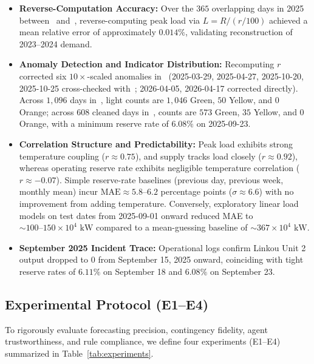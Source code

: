 \documentclass[conference]{IEEEtran}
\begin{document}
\begin{itemize}
    \item \textbf{Reverse-Computation Accuracy:} Over the $365$ overlapping days in 2025 between~\cite{ref3} and~\cite{ref1}, reverse-computing peak load via $L = R / (r/100)$ achieved a mean relative error of approximately $0.014\%$, validating reconstruction of 2023--2024 demand.
    \item \textbf{Anomaly Detection and Indicator Distribution:} Recomputing $r$ corrected six $10\times$-scaled anomalies in~\cite{ref1} (2025-03-29, 2025-04-27, 2025-10-20, 2025-10-25 cross-checked with~\cite{ref3}; 2026-04-05, 2026-04-17 corrected directly). Across $1{,}096$ days in~\cite{ref3}, light counts are $1{,}046$ Green, $50$ Yellow, and $0$ Orange; across $608$ cleaned days in~\cite{ref1}, counts are $573$ Green, $35$ Yellow, and $0$ Orange, with a minimum reserve rate of $6.08\%$ on 2025-09-23.
    \item \textbf{Correlation Structure and Predictability:} Peak load exhibits strong temperature coupling ($r \approx 0.75$), and supply tracks load closely ($r \approx 0.92$), whereas operating reserve rate exhibits negligible temperature correlation ($r \approx -0.07$). Simple reserve-rate baselines (previous day, previous week, monthly mean) incur $\text{MAE} \approx 5.8\text{--}6.2$ percentage points ($\sigma \approx 6.6$) with no improvement from adding temperature. Conversely, exploratory linear load models on test dates from 2025-09-01 onward reduced MAE to $\sim 100\text{--}150 \times 10^4\text{ kW}$ compared to a mean-guessing baseline of $\sim 367 \times 10^4\text{ kW}$.
    \item \textbf{September 2025 Incident Trace:} Operational logs confirm Linkou Unit 2 output dropped to $0$ from September 15, 2025 onward, coinciding with tight reserve rates of $6.11\%$ on September 18 and $6.08\%$ on September 23.
\end{itemize}

\subsection{Experimental Protocol (E1--E4)}
\label{sec:protocol}

To rigorously evaluate forecasting precision, contingency fidelity, agent trustworthiness, and rule compliance, we define four experiments (E1--E4) summarized in Table~\ref{tab:experiments}.
\end{document}
